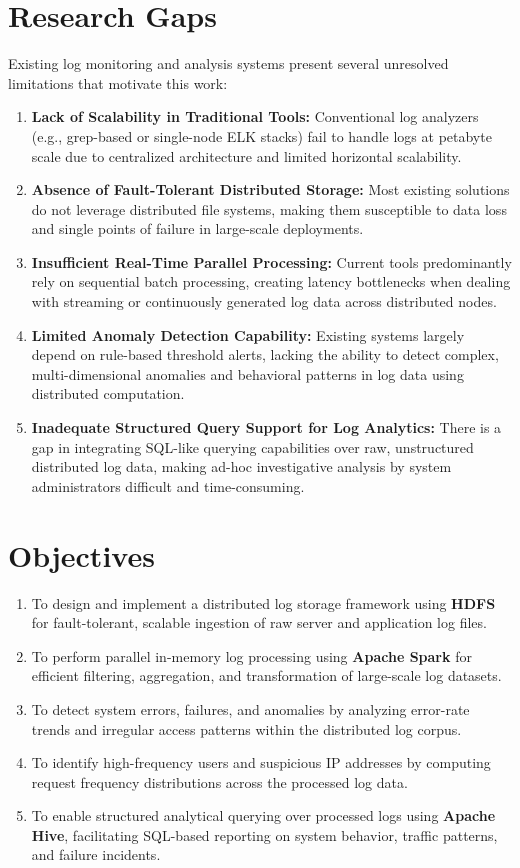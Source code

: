 \documentclass[12pt, a4paper]{article}
\begin{document}
\section*{Research Gaps}
Existing log monitoring and analysis systems present several unresolved limitations that motivate this work:
\begin{enumerate}[label=\textbf{\arabic*.}]
    \item \textbf{Lack of Scalability in Traditional Tools:} Conventional log analyzers (e.g., grep-based or single-node ELK stacks) fail to handle logs at petabyte scale due to centralized architecture and limited horizontal scalability.
    \item \textbf{Absence of Fault-Tolerant Distributed Storage:} Most existing solutions do not leverage distributed file systems, making them susceptible to data loss and single points of failure in large-scale deployments.
    \item \textbf{Insufficient Real-Time Parallel Processing:} Current tools predominantly rely on sequential batch processing, creating latency bottlenecks when dealing with streaming or continuously generated log data across distributed nodes.
    \item \textbf{Limited Anomaly Detection Capability:} Existing systems largely depend on rule-based threshold alerts, lacking the ability to detect complex, multi-dimensional anomalies and behavioral patterns in log data using distributed computation.
    \item \textbf{Inadequate Structured Query Support for Log Analytics:} There is a gap in integrating SQL-like querying capabilities over raw, unstructured distributed log data, making ad-hoc investigative analysis by system administrators difficult and time-consuming.
\end{enumerate}

\section*{Objectives}
\begin{enumerate}[label=\textbf{\arabic*.}]
    \item To design and implement a distributed log storage framework using \textbf{HDFS} for fault-tolerant, scalable ingestion of raw server and application log files.
    \item To perform parallel in-memory log processing using \textbf{Apache Spark} for efficient filtering, aggregation, and transformation of large-scale log datasets.
    \item To detect system errors, failures, and anomalies by analyzing error-rate trends and irregular access patterns within the distributed log corpus.
    \item To identify high-frequency users and suspicious IP addresses by computing request frequency distributions across the processed log data.
    \item To enable structured analytical querying over processed logs using \textbf{Apache Hive}, facilitating SQL-based reporting on system behavior, traffic patterns, and failure incidents.
\end{enumerate}
\end{document}
